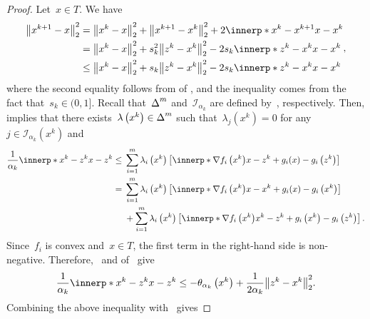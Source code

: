 \documentclass[../main]{subfiles}
\begin{document}
\begin{proof}
    Let~$x \in T$.
    We have
    \begin{equation} \label{eq:pgm_convergence:fejer_pre}
        \begin{aligned}
            \norm*{x^{k + 1} - x}_2^2 &= \norm*{x^k - x}_2^2 + \norm*{x^{k + 1} - x^k}_2^2 + 2 \innerp*{x^k - x^{k + 1}}{x - x^k} \\
                                     &= \norm*{x^k - x}_2^2 + s_k^2 \norm*{z^k - x^k}_2^2 - 2 s_k \innerp*{z^k - x^k}{x - x^k} \\
                                     &\le \norm*{x^k - x}_2^2 + s_k \norm*{z^k - x^k}_2^2 - 2 s_k \innerp*{z^k - x^k}{x - x^k}
        \end{aligned}
    ,\end{equation}
    where the second equality follows from  of , and the inequality comes from the fact that~$s_k \in (0, 1]$.
    Recall that~$\operatorname{\Delta}^m$ and~$\mathcal{I}_{\alpha_k}$ are defined by~, respectively.
    Then,  implies that there exists~$\lambda\left(x^k\right) \in \operatorname{\Delta}^m$ such that~$\lambda_j\left(x^k\right) = 0$ for any~$j \in \mathcal{I}_{\alpha_k}\left(x^k\right)$ and
    \begin{align}
        \frac{1}{\alpha_k} \innerp*{x^k - z^k}{x - z^k} \le{}& \sum_{i = 1}^{m} \lambda_i\left(x^k\right) \left[ \innerp*{\nabla f_i\left(x^k\right)}{x - z^k} + g_i(x) - g_i\left(z^k\right) \right] \\
        ={}& \sum_{i = 1}^{m} \lambda_i\left(x^k\right) \left[ \innerp*{\nabla f_i\left(x^k\right)}{x - x^k} + g_i(x) - g_i\left(x^k\right) \right] \\
           &+ \sum_{i = 1}^{m} \lambda_i\left(x^k\right) \left[ \innerp*{\nabla f_i\left(x^k\right)}{x^k - z^k} + g_i\left(x^k\right) - g_i\left(z^k\right) \right]
    .\end{align}
    Since~$f_i$ is convex and~$x \in T$, the first term in the right-hand side is non-negative.
    Therefore,~ and  of~ give
    \begin{equation}
        \frac{1}{\alpha_k} \innerp*{x^k - z^k}{x - z^k} \le - \theta_{\alpha_k}\left(x^k\right) + \frac{1}{2 \alpha_k} \norm*{z^k - x^k}_2^2
    .\end{equation} 
    Combining the above inequality with~ gives

\end{proof}
\end{document}
